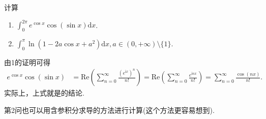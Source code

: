 \documentclass[../../main.tex]{subfiles}%
\begin{document}
\begin{example}
计算
\begin{enumerate}
\item \(\int_{0}^{2\pi} e^{\cos x} \cos(\sin x) \mathrm{d}x\).

\item \(\int_{0}^{\pi} \ln(1 - 2a\cos x + a^{2}) \mathrm{d}x, a \in (0, +\infty) \setminus \{1\}\). 
\end{enumerate}
\end{example}
\begin{remark}
由1的证明可得
\begin{align*}
e^{\cos x}\cos(\sin x) &= \mathrm{Re}\left( \sum_{n = 0}^{\infty} \frac{(e^{\mathrm{i}x})^n}{n!} \right) = \mathrm{Re}\left( \sum_{n = 0}^{\infty} \frac{e^{\mathrm{i}nx}}{n!} \right) = \sum_{n = 0}^{\infty} \frac{\cos(nx)}{n!}.
\end{align*}
实际上，上式就是的结论. 
\end{remark}
\begin{remark}
第2问也可以用含参积分求导的方法进行计算(这个方法更容易想到).
\end{remark}
\end{document}
